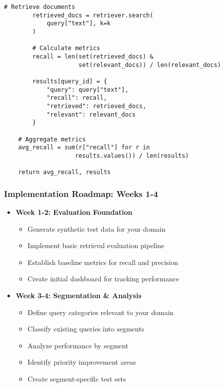 {\begin{frame}[fragile]
\begin{lstlisting}[basicstyle=\tiny\ttfamily, breaklines=true]
        # Retrieve documents
        retrieved_docs = retriever.search(
            query["text"], k=k
        )
        
        # Calculate metrics
        recall = len(set(retrieved_docs) & 
                     set(relevant_docs)) / len(relevant_docs)
        
        results[query_id] = {
            "query": query["text"],
            "recall": recall,
            "retrieved": retrieved_docs,
            "relevant": relevant_docs
        }
    
    # Aggregate metrics
    avg_recall = sum(r["recall"] for r in 
                    results.values()) / len(results)
    
    return avg_recall, results
        \end{lstlisting}
    \end{frame}

    \begin{frame}
        \frametitle{Implementation Roadmap: Weeks 1-4}
        \begin{itemize}
            \item \textbf{Week 1-2: Evaluation Foundation}
            \begin{itemize}
                \item Generate synthetic test data for your domain
                \item Implement basic retrieval evaluation pipeline
                \item Establish baseline metrics for recall and precision
                \item Create initial dashboard for tracking performance
            \end{itemize}
            \item \textbf{Week 3-4: Segmentation \& Analysis}
            \begin{itemize}
                \item Define query categories relevant to your domain
                \item Classify existing queries into segments
                \item Analyze performance by segment
                \item Identify priority improvement areas
                \item Create segment-specific test sets
            \end{itemize}
        \end{itemize}
    \end{frame}

}
